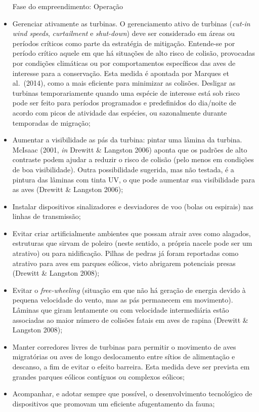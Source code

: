 \documentclass[
  oneside]{scrbook}
\begin{document}
\begin{itemize}
  Fase do empreendimento: Operação
\item
  Gerenciar ativamente as turbinas. O gerenciamento ativo de turbinas (\emph{cut-in wind speeds}, \emph{curtailment} e \emph{shut-down}) deve ser considerado em áreas ou períodos críticos como parte da estratégia de mitigação. Entende-se por período crítico aquele em que há situações de alto risco de colisão, provocadas por condições climáticas ou por comportamentos específicos das aves de interesse para a conservação. Esta medida é apontada por Marques et al.~(2014), como a mais eficiente para minimizar as colisões. Desligar as turbinas temporariamente quando uma espécie de interesse está sob risco pode ser feito para períodos programados e predefinidos do dia/noite de acordo com picos de atividade das espécies, ou sazonalmente durante temporadas de migração;
\item
  Aumentar a visibilidade as pás da turbina: pintar uma lâmina da turbina. McIsaac (2001, \emph{in} Drewitt \& Langston 2006) aponta que os padrões de alto contraste podem ajudar a reduzir o risco de colisão (pelo menos em condições de boa visibilidade). Outra possibilidade sugerida, mas não testada, é a pintura das lâminas com tinta UV, o que pode aumentar sua visibilidade para as aves (Drewitt \& Langston 2006);
\item
  Instalar dispositivos sinalizadores e desviadores de voo (bolas ou espirais) nas linhas de transmissão;
\item
  Evitar criar artificialmente ambientes que possam atrair aves como alagados, estruturas que sirvam de poleiro (neste sentido, a própria nacele pode ser um atrativo) ou para nidificação. Pilhas de pedras já foram reportadas como atrativo para aves em parques eólicos, visto abrigarem potenciais presas (Drewitt \& Langston 2008);
\item
  Evitar o \emph{free-wheeling} (situação em que não há geração de energia devido à pequena velocidade do vento, mas as pás permanecem em movimento). Lâminas que giram lentamente ou com velocidade intermediária estão associadas ao maior número de colisões fatais em aves de rapina (Drewitt \& Langston 2008);
\item
  Manter corredores livres de turbinas para permitir o movimento de aves migratórias ou aves de longo deslocamento entre sítios de alimentação e descanso, a fim de evitar o efeito barreira. Esta medida deve ser prevista em grandes parques eólicos contíguos ou complexos eólicos;
\item
  Acompanhar, e adotar sempre que possível, o desenvolvimento tecnológico de dispositivos que promovam um eficiente afugentamento da fauna;

\end{itemize}
\end{document}
